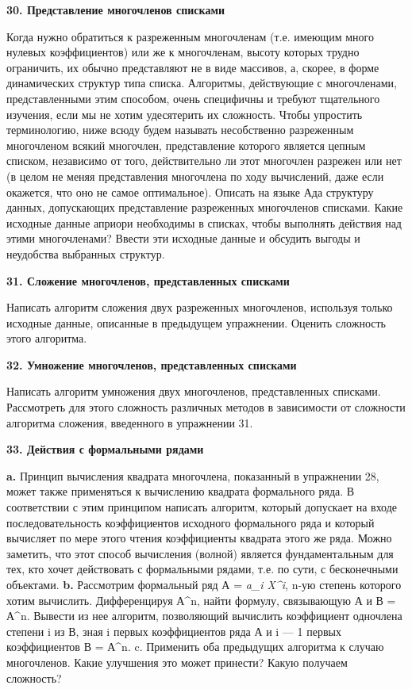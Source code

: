\textbf{30. Представление многочленов списками}

Когда нужно обратиться к разреженным многочленам (т.е. имеющим много нулевых коэффициентов) или же к многочленам, высоту которых трудно ограничить, их обычно представляют не в виде массивов, а, скорее, в форме динамических структур типа списка. Алгоритмы, действующие с многочленами, представленными этим способом, очень специфичны и требуют тщательного изучения, если мы не хотим удесятерить их сложность. Чтобы упростить терминологию, ниже всюду будем называть несобственно разреженным многочленом всякий многочлен, представление которого является цепным списком, независимо от того, действительно ли этот многочлен разрежен или нет (в целом не меняя представления многочлена по ходу вычислений, даже если окажется, что оно не самое оптимальное).
Описать на языке Ада структуру данных, допускающих представление разреженных многочленов списками. Какие исходные данные априори необходимы в списках, чтобы выполнять действия над этими многочленами? Ввести эти исходные данные и обсудить выгоды и неудобства выбранных структур.

\textbf{31. Сложение многочленов, представленных списками}

Написать алгоритм сложения двух разреженных многочленов, используя только исходные данные, описанные в предыдущем упражнении. Оценить сложность этого алгоритма.

\textbf{32. Умножение многочленов, представленных списками}

Написать алгоритм умножения двух многочленов, представленных списками. Рассмотреть для этого сложность различных методов в зависимости от сложности алгоритма сложения, введенного в упражнении 31.

\textbf{33. Действия с формальными рядами}

\textbf{a.} Принцип вычисления квадрата многочлена, показанный в упражнении 28, может также применяться к вычислению квадрата формального ряда. В соответствии с этим принципом написать алгоритм, который допускает на входе последовательность коэффициентов исходного формального ряда и который вычисляет по мере этого чтения коэффициенты квадрата этого же ряда.
Можно заметить, что этот способ вычисления (волной) является фундаментальным для тех, кто хочет действовать с формальными рядами, т.е. по сути, с бесконечными объектами.
\textbf{b.} Рассмотрим формальный ряд А = \sum \textit{a_{i} X^{i}}, n-ую степень которого
хотим вычислить. Дифференцируя А^{n}, найти формулу, связывающую А и В = А^{n}. Вывести из нее алгоритм, позволяющий вычислить коэффициент одночлена степени i из В, зная i первых коэффициентов ряда А и i — 1 первых коэффициентов В = А^{n}.
c. Применить оба предыдущих алгоритма к случаю многочленов. Какие улучшения это может принести? Какую получаем сложность?


